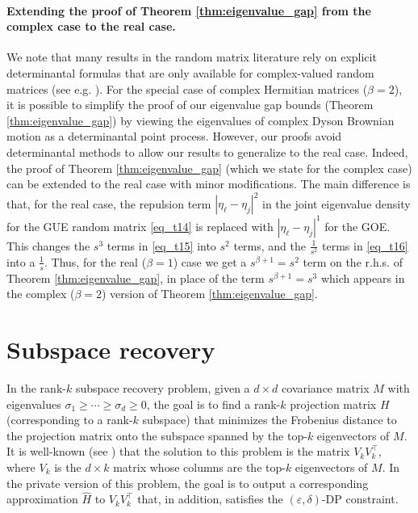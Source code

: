\documentclass[11pt,letterpaper]{article}
\newcommand{\eps}{\varepsilon}
\begin{document}
\paragraph{Extending the proof of Theorem \ref{thm:eigenvalue_gap} from the complex case to the real case.}
 We note that many results in the random matrix literature rely on explicit determinantal formulas that are only available for complex-valued random matrices (see e.g. \cite{ratnarajah2004eigenvalues, johansson2005random, leake2020polynomial}).
 {For the special case of complex Hermitian matrices ($\beta =2$), it is possible to simplify the proof of our eigenvalue gap bounds (Theorem \ref{thm:eigenvalue_gap}) by viewing the eigenvalues of complex Dyson Brownian motion as a determinantal point process.}
However, our proofs avoid determinantal methods to allow our results to generalize to the real case.
%
 Indeed, the proof of Theorem \ref{thm:eigenvalue_gap} (which we state for the complex case) can be extended to the real case with minor modifications.
%
The main difference is that, for the real case, the repulsion term  $|\eta_{\ell} - \eta_j|^2$ in the joint eigenvalue density for the GUE random matrix \eqref{eq_t14} is replaced with $|\eta_{\ell} - \eta_j|^1$ for the GOE.
%
This changes the $s^3$ terms in \eqref{eq_t15} into $s^2$ terms, and the $\frac{1}{s^2}$ terms in \eqref{eq_t16} into a $\frac{1}{s}$.
Thus, for the real ($\beta =1$) case we get a $s^{\beta+1} = s^2$ term on the r.h.s. of Theorem \ref{thm:eigenvalue_gap}, in place of the term $s^{\beta+1} = s^3$ which appears in the complex ($\beta = 2$) version of Theorem \ref{thm:eigenvalue_gap}.
%



\section{Subspace recovery}\label{sec:subspace}

In the rank-$k$ subspace recovery problem, given a $d \times d$ covariance matrix $M$ with eigenvalues $\sigma_1 \geq \cdots \geq \sigma_d \geq 0$, the goal is to find a rank-$k$ projection matrix $H$ (corresponding to a rank-$k$ subspace) that minimizes the Frobenius distance to the projection matrix onto the subspace spanned by the top-$k$ eigenvectors of $M$.  
%
It is well-known (see \cite{bhatia2013matrix}) that the solution to this problem is the matrix $V_k V_k^\top$, where $V_k$ is the $d \times k$ matrix whose columns are the top-$k$ eigenvectors of $M$.
%
In the private version of this problem, the goal is to output a corresponding approximation $\hat{H}$ to $V_k V_k^\top$ that, in addition, satisfies the $(\eps,\delta)$-DP constraint.
%
\end{document}
